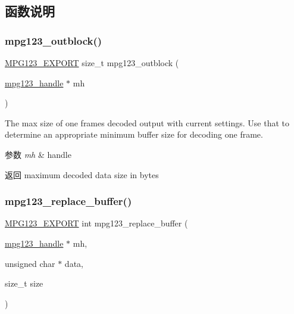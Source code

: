 \subsection{函数说明}
\mbox{\label{group__mpg123__lowio_ga00c0874bdad4a3f6366a035694f298d6}} 
\subsubsection{\texorpdfstring{mpg123\+\_\+outblock()}{mpg123\_outblock()}}
{\footnotesize\ttfamily \hyperlink{mpg123_8h_a2ba98cfba3f760879df70e755b2a61cc}{M\+P\+G123\+\_\+\+E\+X\+P\+O\+RT} size\+\_\+t mpg123\+\_\+outblock (\begin{DoxyParamCaption}\item[{\hyperlink{group__mpg123__init_ga6728e2839a395f3a07d4514da659faca}{mpg123\+\_\+handle} $\ast$}]{mh }\end{DoxyParamCaption})}

The max size of one frame\textquotesingle{}s decoded output with current settings. Use that to determine an appropriate minimum buffer size for decoding one frame. 
\begin{DoxyParams}{参数}
{\em mh} & handle \\
\hline
\end{DoxyParams}
\begin{DoxyReturn}{返回}
maximum decoded data size in bytes 
\end{DoxyReturn}
\mbox{\label{group__mpg123__lowio_gaaae8cfb0de3a2bc1dc97d916aa519772}} 
\subsubsection{\texorpdfstring{mpg123\+\_\+replace\+\_\+buffer()}{mpg123\_replace\_buffer()}}
{\footnotesize\ttfamily \hyperlink{mpg123_8h_a2ba98cfba3f760879df70e755b2a61cc}{M\+P\+G123\+\_\+\+E\+X\+P\+O\+RT} int mpg123\+\_\+replace\+\_\+buffer (\begin{DoxyParamCaption}\item[{\hyperlink{group__mpg123__init_ga6728e2839a395f3a07d4514da659faca}{mpg123\+\_\+handle} $\ast$}]{mh,  }\item[{unsigned char $\ast$}]{data,  }\item[{size\+\_\+t}]{size }\end{DoxyParamCaption})}


